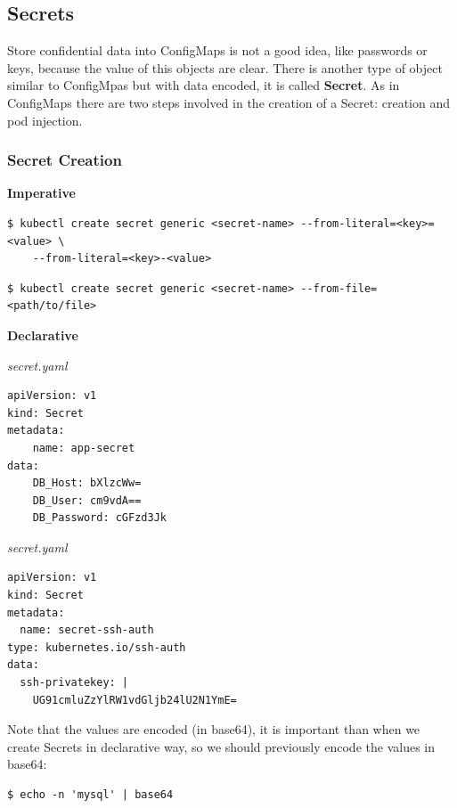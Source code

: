 \documentclass{article}
\newenvironment{blocktemplateIII}[1]{%
    \tcolorbox[beamer,%
    noparskip,breakable,
    ,colframe=Red,%
    colbacklower=LimeGreen!75!LightGreen,%
    title=#1]}%
    {\endtcolorbox}
\newenvironment{codetemplate}[1][]{%
  \mybasecolorbox[#1]
  \itshape
}{%
  \endmybasecolorbox
}
\begin{document}
\subsection{Secrets}
Store confidential data into ConfigMaps is not a good idea, like passwords or keys, because the value of this objects are clear. There is another type of object similar to ConfigMpas but with data encoded, it is called \textbf{Secret}. As in ConfigMaps there are two steps involved in the creation of a Secret: creation and pod injection.
\subsubsection{Secret Creation}

\textbf{Imperative}
\begin{codetemplate}{}
\begin{verbatim}
$ kubectl create secret generic <secret-name> --from-literal=<key>=<value> \
    --from-literal=<key>-<value>
\end{verbatim}
\end{codetemplate}

\begin{codetemplate}{}
\begin{verbatim}
$ kubectl create secret generic <secret-name> --from-file=<path/to/file>
\end{verbatim}
\end{codetemplate}

\textbf{Declarative}

\begin{codetemplate}{secret.yaml}
\begin{verbatim}
apiVersion: v1
kind: Secret
metadata:
    name: app-secret
data:
    DB_Host: bXlzcWw=
    DB_User: cm9vdA==
    DB_Password: cGFzd3Jk
\end{verbatim}
\end{codetemplate}

\begin{codetemplate}{secret.yaml}
\begin{verbatim}
apiVersion: v1
kind: Secret
metadata:
  name: secret-ssh-auth
type: kubernetes.io/ssh-auth
data:
  ssh-privatekey: |
    UG91cmluZzYlRW1vdGljb24lU2N1YmE=    
\end{verbatim}
\end{codetemplate}

\begin{blocktemplateIII}{WARNING}
Note that the values are encoded (in base64), it is important than when we create Secrets in declarative way, so we should previously encode the values in base64:
\begin{codetemplate}{}
\begin{verbatim}
$ echo -n 'mysql' | base64
\end{verbatim}
\end{codetemplate}
\end{blocktemplateIII}
\end{document}
